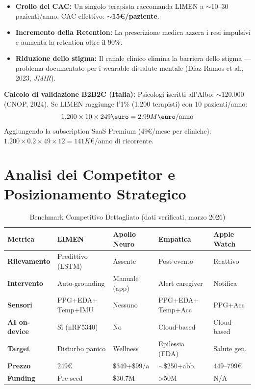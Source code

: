\documentclass[12pt,a4paper]{article}
\begin{document}
\begin{itemize}
    \item \textbf{Crollo del CAC:} Un singolo terapista raccomanda LIMEN a $\sim$10--30 pazienti/anno. CAC effettivo: \textbf{$\sim$15\euro/paziente}.
    \item \textbf{Incremento della Retention:} La prescrizione medica azzera i resi impulsivi e aumenta la retention oltre il 90\%.
    \item \textbf{Riduzione dello stigma:} Il canale clinico elimina la barriera dello stigma --- problema documentato per i wearable di salute mentale (Diaz-Ramos et al., 2023, \textit{JMIR}).
\end{itemize}

\textbf{Calcolo di validazione B2B2C (Italia):}
Psicologi iscritti all'Albo: $\sim$120.000 (CNOP, 2024). Se LIMEN raggiunge l'1\% (1.200 terapisti) con 10 pazienti/anno:
$$1.200 \times 10 \times 249\text{\euro} = 2.99M\text{\euro/anno}$$
Aggiungendo la subscription SaaS Premium (49\euro/mese per cliniche): $1.200 \times 0.2 \times 49 \times 12 = 141K$\euro/anno di ricorrente.

\section{Analisi dei Competitor e Posizionamento Strategico}

\begin{table}[h!]
    \centering
    \small
    \caption{Benchmark Competitivo Dettagliato (dati verificati, marzo 2026)}
    \vspace{0.3cm}
    \begin{tabularx}{\textwidth}{@{}l X X X X@{}}
        \toprule
        \textbf{Metrica} & \textbf{LIMEN} & \textbf{Apollo Neuro} & \textbf{Empatica} & \textbf{Apple Watch} \\ \midrule
        \textbf{Rilevamento} & Predittivo (LSTM) & Assente & Post-evento & Reattivo \\
        \textbf{Intervento} & Auto-grounding & Manuale (app) & Alert caregiver & Notifica \\
        \textbf{Sensori} & PPG+EDA+ Temp+IMU & Nessuno & PPG+EDA+ Temp+Acc & PPG+Acc \\
        \textbf{AI on-device} & S\`i (nRF5340) & No & Cloud-based & Cloud-based \\
        \textbf{Target} & Disturbo panico & Wellness & Epilessia (FDA) & Salute gen. \\
        \textbf{Prezzo} & 249\euro & \$349+\$99/a & $\sim$\$250+abb. & 449--799\euro \\
        \textbf{Funding} & Pre-seed & \$30.7M & >50M & N/A \\
        \bottomrule
    \end{tabularx}
\end{table}
\end{document}
